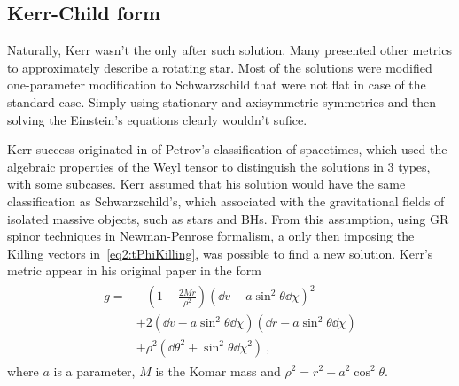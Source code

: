 \subsection{Kerr-Child form}

Naturally, Kerr wasn't the only after such solution.
Many presented other metrics to approximately describe a rotating star. 
Most of the solutions were modified one-parameter modification to Schwarzschild that were not flat in case of the standard case. 
Simply using stationary and axisymmetric symmetries and then solving the Einstein's equations clearly wouldn't sufice.

Kerr success originated in of Petrov's classification of spacetimes, which used the algebraic properties of the Weyl tensor to distinguish the solutions in 3 types, with some subcases.
Kerr assumed that his solution would have the same classification as Schwarzschild's, which associated with the gravitational fields of isolated massive objects, such as stars and BHs. 
From this assumption, using GR spinor techniques in Newman-Penrose formalism, a only then imposing the Killing vectors in~\eqref{eq2:tPhiKilling}, was possible to find a new solution. Kerr's metric appear in his original paper in the form
\begin{align}
    \begin{split}
        g = &- \left(1 - \frac{2 M r}{\rho^2} \right) (\dd v - a \sin^2\theta \dd \chi )^2 \\
        &+ 2  (\dd v - a \sin^2\theta \dd \chi )  (\dd r - a \sin^2\theta \dd \chi ) \\
        &+ \rho^2 (\dd \theta^2 + \sin^2\theta \dd \chi^2 ) ~,
    \end{split}
    \label{eq2:KerrIngoingEF}
\end{align}
where $a$ is a parameter, $M$ is the Komar mass and $\rho^2 = r^2 + a^2 \cos^2\theta$. 

